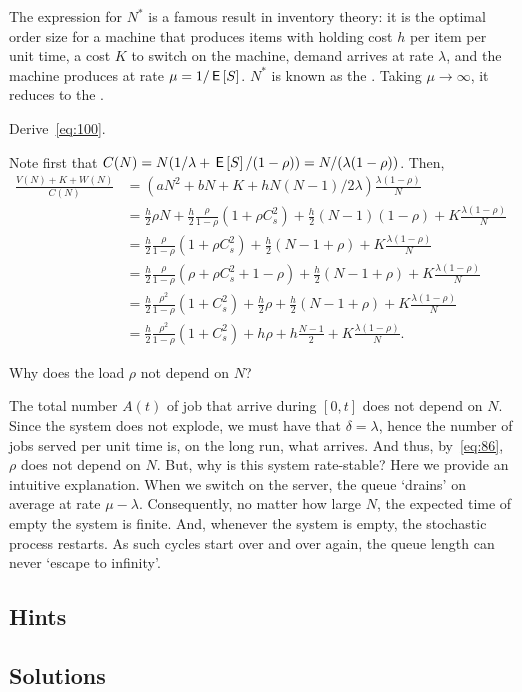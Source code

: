 \documentclass[companion]{subfiles}
\begin{document}
\begin{remark}
  The expression for $N^*$ is a famous result in inventory theory: it is the optimal order size for a machine that produces items with holding cost $h$ per item per unit time, a cost $K$ to switch on the machine, demand arrives at rate $\lambda$, and the machine produces at rate $\mu=1/\,\mathsf{E}\left[S\right]$.
  $N^*$ is known as the .
  Taking $\mu\to\infty$, it reduces to the .
\end{remark}

\begin{exercise}
Derive~\cref{eq:100}.
\begin{solution}
  Note first that $C(N) = N(1/\lambda + \,\mathsf{E}\left[S\right] / (1-\rho)) = N/(\lambda(1-\rho))$. Then,
  \begin{align*}
    \frac{V(N) + K + W(N)}{C(N)}
    &= \left(aN^2 + bN + K + h N(N-1)/2 \lambda\right) \frac{\lambda(1-\rho)}N \\
    &= \frac h 2 \rho N  + \frac h 2 \frac \rho{1-\rho} (1+\rho C_s^2) + \frac h 2 (N-1)(1-\rho) + K \frac{\lambda(1-\rho)}N \\
    &= \frac h 2 \frac \rho{1-\rho} (1+\rho C_s^2) + \frac h 2 (N-1 + \rho) + K \frac{\lambda(1-\rho)}N \\
    &= \frac h 2 \frac \rho{1-\rho} (\rho + \rho C_s^2 + 1 - \rho) + \frac h 2 (N-1 + \rho) + K \frac{\lambda(1-\rho)}N \\
    &= \frac h 2 \frac{\rho^2}{1-\rho} (1+ C_s^2) +\frac h 2 \rho + \frac h 2 (N-1 + \rho) + K \frac{\lambda(1-\rho)}N \\
    &= \frac h 2 \frac{\rho^2}{1-\rho} (1+ C_s^2) + h \rho + h \frac{N-1}2 + K \frac{\lambda(1-\rho)}N.
  \end{align*}
\end{solution}
\end{exercise}


\begin{extra}
  Why does the load $\rho$ not depend on $N$?
\begin{solution}
  The total number $A(t)$ of job that arrive during $[0,t]$ does not depend on $N$.
  Since the system does not explode, we must have that $\delta = \lambda$, hence the number of jobs served per unit time is, on the long run, what arrives.
  And thus, by~\cref{eq:86}, $\rho$ does not depend on $N$.
  But, why is this system rate-stable?
  Here we provide an intuitive explanation.
  When we switch on the server, the queue `drains' on average at rate $\mu-\lambda$.
  Consequently, no matter how large $N$, the expected time of empty the system is finite.
  And, whenever the system is empty, the stochastic process restarts.
  As such cycles start over and over again, the queue length can never `escape to infinity'.
\end{solution}
\end{extra}

{
\subsection*{Hints}

\subsection*{Solutions}

}
\end{document}
